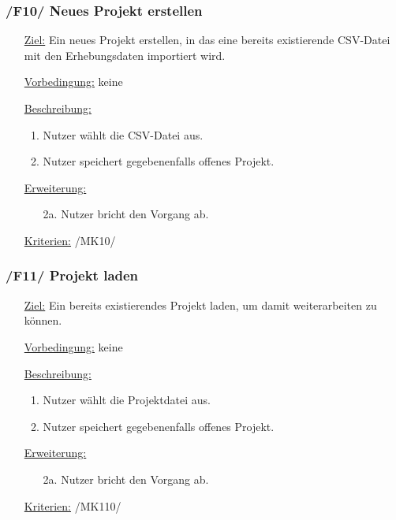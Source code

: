 \documentclass{article}
\begin{document}
\subsubsection*{\textbf{/F10/} Neues Projekt erstellen} \label{sec:f:Neues Projekt erstellen}
\begin{itemize}
    \item[\underline{Ziel:}] Ein neues Projekt erstellen, in das eine bereits existierende CSV-Datei mit den Erhebungsdaten importiert wird.
    \item[\underline{Vorbedingung:}] keine
    \item[\underline{Beschreibung:}]
    \begin{enumerate}
        \item Nutzer wählt die CSV-Datei aus.
        \item Nutzer speichert gegebenenfalls offenes Projekt.
    \end{enumerate}
    \item[\underline{Erweiterung:}]
    \begin{itemize}
        \item[2a.] Nutzer bricht den Vorgang ab.
    \end{itemize}
    \item[\underline{Kriterien:}] /MK10/
\end{itemize}

\subsubsection*{\textbf{/F11/} Projekt laden} \label{sec:f:Projekt laden}
\begin{itemize}
    \item[\underline{Ziel:}] Ein bereits existierendes Projekt laden, um damit weiterarbeiten zu können.
    \item[\underline{Vorbedingung:}] keine
    \item[\underline{Beschreibung:}]
    \begin{enumerate}
        \item Nutzer wählt die Projektdatei aus.
        \item Nutzer speichert gegebenenfalls offenes Projekt.
    \end{enumerate}
    \item[\underline{Erweiterung:}]
    \begin{itemize}
        \item[2a.] Nutzer bricht den Vorgang ab.
    \end{itemize}
    \item[\underline{Kriterien:}] /MK110/
\end{itemize}
\end{document}

